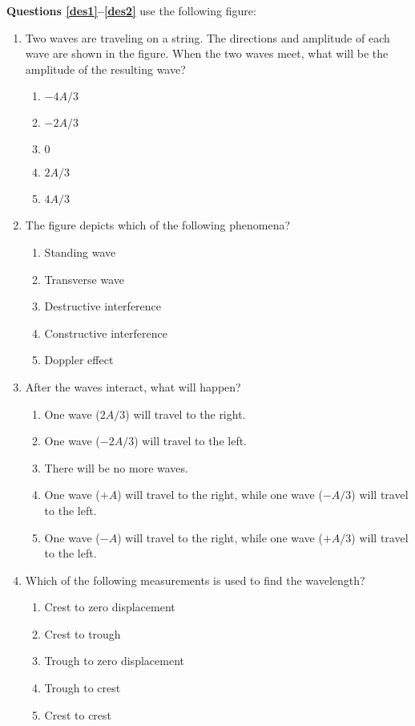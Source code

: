 \documentclass{../../../oss-classkick}
\begin{document}
\begin{multicols}{2}
  \textbf{Questions \ref{des1}--\ref{des2}} use the following figure:
  \begin{enumerate}[leftmargin=18pt,resume]
  \item Two waves are traveling on a string. The directions and amplitude of
    each wave are shown in the figure. When the two waves meet, what
    will be the amplitude of the resulting wave?
    \label{des1}
    \begin{enumerate}[nosep,leftmargin=18pt,label=(\Alph*)]
    \item $-4A/3$
    \item $-2A/3$
    \item $0$
    \item $2A/3$
    \item $4A/3$
    \end{enumerate}
    
  \item The figure depicts which of the following phenomena?
    \begin{enumerate}[nosep,leftmargin=18pt,label=(\Alph*)]
    \item Standing wave
    \item Transverse wave
    \item Destructive interference
    \item Constructive interference
    \item Doppler effect
    \end{enumerate}
    \vspace{.7in}
    
  \item After the waves interact, what will happen?
    \label{des2}
    \begin{enumerate}[nosep,leftmargin=18pt,label=(\Alph*)]
    \item One wave ($2A/3$) will travel to the right.
    \item One wave ($-2A/3$) will travel to the left.
    \item There will be no more waves.
    \item One wave ($+A$) will travel to the right, while one wave ($-A/3$)
      will travel to the left.
    \item One wave ($-A$) will travel to the right, while one wave ($+A/3$)
      will travel to the left.
    \end{enumerate}
    \vspace{.7in}
    
  \item Which of the following measurements is used to find the wavelength?
    \begin{enumerate}[nosep,leftmargin=18pt,label=(\Alph*)]
    \item Crest to zero displacement
    \item Crest to trough
    \item Trough to zero displacement
    \item Trough to crest
    \item Crest to crest
    \end{enumerate}
    \vspace{.7in}
    

\end{enumerate}
\end{multicols}
\end{document}

